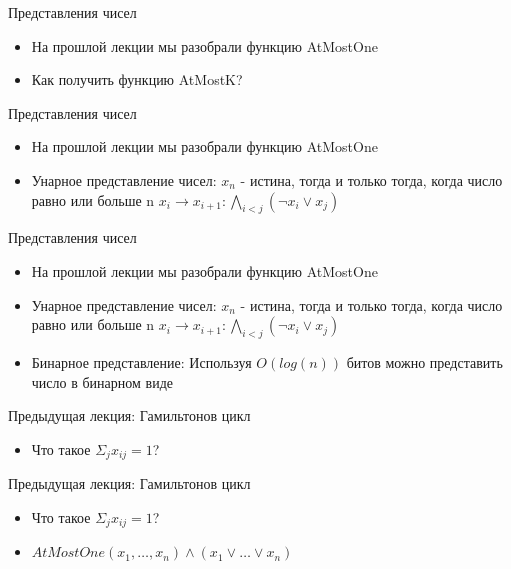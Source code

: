 \documentclass{beamer}
\begin{document}
\begin{frame}{Представления чисел}
\begin{itemize}
\item На прошлой лекции мы разобрали функцию AtMostOne
\item Как получить функцию AtMostK?
\end{itemize}
\end{frame}

\begin{frame}{Представления чисел}
\begin{itemize}
\item На прошлой лекции мы разобрали функцию AtMostOne
\item Унарное представление чисел:\newline
$x_n$ - истина, тогда и только тогда, когда число равно или больше n\newline
$x_i \rightarrow x_{i+1}: \bigwedge_{i<j}(\lnot x_i \vee x_j)$
\end{itemize}
\end{frame}

\begin{frame}{Представления чисел}
\begin{itemize}
\item На прошлой лекции мы разобрали функцию AtMostOne
\item Унарное представление чисел:\newline
$x_n$ - истина, тогда и только тогда, когда число равно или больше n\newline
$x_i \rightarrow x_{i+1}: \bigwedge_{i<j}(\lnot x_i \vee x_j)$
\item Бинарное представление:
Используя $O(log(n))$ битов можно представить число в бинарном виде
\end{itemize}
\end{frame}

\begin{frame}{Предыдущая лекция: Гамильтонов цикл}
\begin{itemize}
\item Что такое $\Sigma_{j} x_{ij} = 1$?
\end{itemize}
\end{frame}

\begin{frame}{Предыдущая лекция: Гамильтонов цикл}
\begin{itemize}
\item Что такое $\Sigma_{j} x_{ij} = 1$?
\item $AtMostOne(x_1, \dots, x_n) \wedge (x_1 \vee \dots \vee x_n)$
\end{itemize}
\end{frame}
\end{document}
